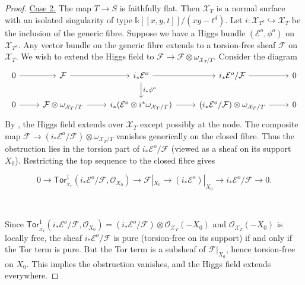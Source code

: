 \documentclass[11pt]{amsart}
\newcommand {\Tor} {\mathsf{Tor}}
\theoremstyle{plain}
\numberwithin{equation}{section}
\theoremstyle{definition}
\theoremstyle{plain}
\begin{document}
\begin{proof}
\medskip

\underline{Case 2.} The map $  T \to S  $ is faithfully flat.
Then $  \mathcal{X}_T  $ is a normal surface with an isolated singularity of type $  \mathbb{k}[[x,y,t]]/(xy - t^d)  $. Let $  i \colon \mathcal{X}_{T^o} \hookrightarrow \mathcal{X}_T  $ be the inclusion of the generic fibre. Suppose we have a Higgs bundle $  (\mathcal{E}^o, \phi^o)  $ on $  \mathcal{X}_{T^o}  $. Any vector bundle on the generic fibre extends to a torsion-free sheaf $  \mathcal{F}  $ on $  \mathcal{X}_T  $. We wish to extend the Higgs field to $  \mathcal{F} \to \mathcal{F} \otimes \omega_{\mathcal{X}_T/T}  $.
Consider the diagram
\begin{equation}
\begin{tikzcd}
0\arrow{r} & \mathcal F \arrow{r} & i_*\mathcal E^o\arrow["i_*\phi^o"]{d}\arrow{r} & i_*\mathcal E^{o}/{\mathcal F} \arrow{r} & 0\\
0\arrow{r} & \mathcal F\otimes \omega_{\mathcal X_T/T} \arrow{r} & i_*(\mathcal E^{o}\otimes i^{*}\omega_{\mathcal X_T/T})\arrow{r} & (i_*\mathcal E^{o}/{\mathcal F})\otimes \omega_{\mathcal X_T/T}\arrow{r} & 0
\end{tikzcd}
\end{equation}
By \cite[Lemma 6.5]{17a}, the Higgs field extends over $  \mathcal{X}_T  $ except possibly at the node. The composite map $  \mathcal{F} \to (i_*\mathcal{E}^o / \mathcal{F}) \otimes \omega_{\mathcal{X}_T/T}  $ vanishes generically on the closed fibre. Thus the obstruction lies in the torsion part of $  i_*\mathcal{E}^o / \mathcal{F}  $ (viewed as a sheaf on its support $  X_0  $). Restricting the top sequence to the closed fibre gives
\

\begin{equation}
0\longrightarrow \Tor^1_{_{\mathcal X_T}}(i_*\mathcal E^{o}/{\mathcal F}, \mathcal O_{X_0})\longrightarrow \mathcal F|_{X_0}\longrightarrow (i_*\mathcal E^{o})|_{X_0}\longrightarrow i_*\mathcal E^{o}/{\mathcal F}\longrightarrow 0.
\end{equation}

\

\noindent
Since $  \Tor^1_{_{\mathcal X_T}}(i_*\mathcal E^{o}/{\mathcal F}, \mathcal O_{X_0})= (i_*\mathcal{E}^o / \mathcal{F}) \otimes \mathcal{O}_{\mathcal{X}_T}(-X_0)  $ and $  \mathcal{O}_{\mathcal{X}_T}(-X_0)  $ is locally free, the sheaf $  i_*\mathcal{E}^o / \mathcal{F}  $ is pure (torsion-free on its support) if and only if the Tor term is pure. But the Tor term is a subsheaf of $  \mathcal{F}|_{X_0}  $, hence torsion-free on $  X_0  $. This implies the obstruction vanishes, and the Higgs field extends everywhere.


\end{proof}
\end{document}
